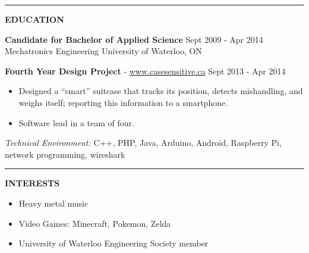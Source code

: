 \documentclass{letter}
\begin{document}
\vskip 2pt
\hrule

\newpage
{\large\bf EDUCATION}

{\bf Candidate for Bachelor of Applied Science} \hfill Sept 2009 - Apr 2014 \\
Mechatronics Engineering \hfill University of Waterloo, ON

{\large\bf Fourth Year Design Project} - \href{http://www.casesensitive.ca}{www.casesensitive.ca} \hfill Sept 2013 - Apr 2014
\begin{itemize}
  \item Designed a ``smart'' suitcase that tracks its position, detects mishandling, and weighs itself; reporting this information to a smartphone.
  \item Software lead in a team of four.
\end{itemize}
\emph{Technical Environment:} C++, PHP, Java, Arduino, Android, Raspberry Pi, network programming, wireshark

\vskip 2pt
\hrule
{\large\bf INTERESTS}
\begin{itemize}
  \item Heavy metal music
  \item Video Games: Minecraft, Pokemon, Zelda
  \item University of Waterloo Engineering Society member
\end{itemize}
\end{document}
